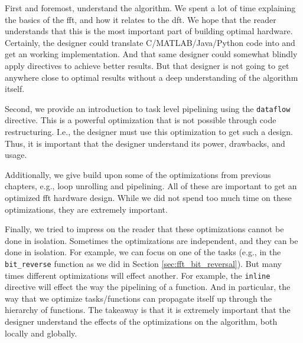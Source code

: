 First and foremost, understand the algorithm. We spent a lot of time explaining the basics of the \gls{fft}, and how it relates to the \gls{dft}. We hope that the reader understands that this is the most important part of building optimal hardware. Certainly, the designer could translate C/MATLAB/Java/Python code into \VHLS and get an working implementation. And that same designer could somewhat blindly apply directives to achieve better results. But that designer is not going to get anywhere close to optimal results without a deep understanding of the algorithm itself.

Second, we provide an introduction to  task level pipelining using the \lstinline{dataflow} directive. This is a powerful optimization that is not possible through code restructuring. I.e., the designer must use this optimization to get such a design. Thus, it is important that the designer understand its power, drawbacks, and usage.

Additionally, we give build upon some of the optimizations from previous chapters, e.g., loop unrolling and pipelining. All of these are important to get an optimized \gls{fft} hardware design. While we did not spend too much time on these optimizations, they are extremely important.

Finally, we tried to impress on the reader that these optimizations cannot be done in isolation. Sometimes the optimizations are independent, and they can be done in isolation. For example, we can focus on one of the tasks (e.g., in the \lstinline{bit_reverse} function as we did in Section \ref{sec:fft_bit_reversal}). But many times different optimizations will effect another. For example, the \lstinline{inline} directive will effect the way the pipelining of a function. And in particular, the way that we optimize tasks/functions can propagate itself up through the hierarchy of functions.  The takeaway is that it is extremely important that the designer understand the effects of the optimizations on the algorithm, both locally and globally.